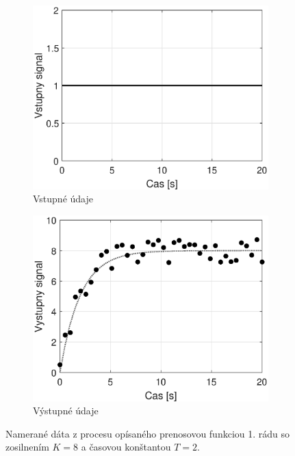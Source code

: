 \begin{figure}
	\centering
	\begin{subfigure}[b]{0.48\textwidth}
		\centering
		\includegraphics[width=\linewidth]{images/gpe_tf_ex_input}
		\caption{Vstupné údaje}
	\end{subfigure}
	\begin{subfigure}[b]{0.48\textwidth}
		\centering
		\includegraphics[width=\linewidth]{images/gpe_tf_ex_output}
		\caption{Výstupné údaje}
	\end{subfigure}
	\caption{Namerané dáta z procesu opísaného prenosovou funkciou 1. rádu so zosilnením $ K = 8 $ a časovou konštantou $ T = 2 $.}
	\label{fig:gpe_tf_ex_data}
\end{figure}

